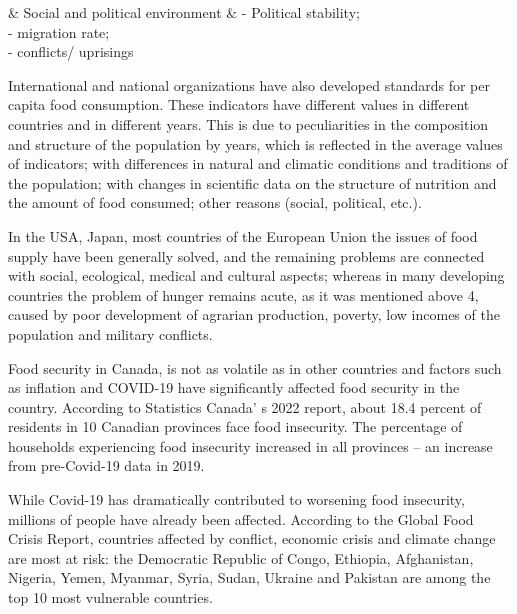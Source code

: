 \begin{longtblr}[
  label = none,
  entry = none,
  caption = {\bfseries Table 2 - UNICEF indicators for assessing food security and nutrition at national and regional levels {[}9, 10{]}},
]
                              & {\small Social and political environment                            }& {- Political stability;\\- migration rate;\\- conflicts/ uprisings}                                                                                                                                                                                                                                                                                                                                                                                                                           
\end{longtblr}

\begin{multicols}{2}
International and national organizations have also developed standards
for per capita food consumption. These indicators have different values
in different countries and in different years. This is due to
peculiarities in the composition and structure of the population by
years, which is reflected in the average values of indicators; with
differences in natural and climatic conditions and traditions of the
population; with changes in scientific data on the structure of
nutrition and the amount of food consumed; other reasons (social,
political, etc.).

In the USA, Japan, most countries of the European Union the issues of
food supply have been generally solved, and the remaining problems are
connected with social, ecological, medical and cultural aspects; whereas
in many developing countries the problem of hunger remains acute, as it
was mentioned above 4, caused by poor development of agrarian
production, poverty, low incomes of the population and military
conflicts.

Food security in Canada, is not as volatile as in other countries and
factors such as inflation and COVID-19 have significantly affected food
security in the country. According to Statistics
Canada' s 2022 report, about 18.4 percent of residents in
10 Canadian provinces face food insecurity. The percentage of households
experiencing food insecurity increased in all provinces -- an increase
from pre-Covid-19 data in 2019.

While Covid-19 has dramatically contributed to worsening food
insecurity, millions of people have already been affected. According to
the Global Food Crisis Report, countries affected by conflict, economic
crisis and climate change are most at risk: the Democratic Republic of
Congo, Ethiopia, Afghanistan, Nigeria, Yemen, Myanmar, Syria, Sudan,
Ukraine and Pakistan are among the top 10 most vulnerable countries.


\end{multicols}
